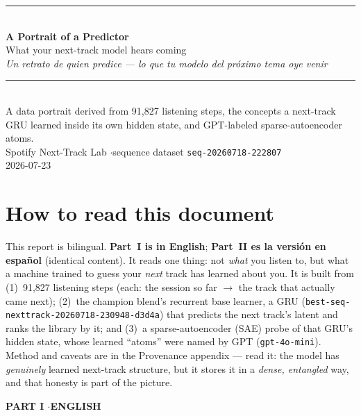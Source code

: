 \documentclass[11pt]{article}
\begin{document}
\begin{titlepage}
\centering
\vspace*{3cm}
{\color{accent}\rule{\textwidth}{2pt}}\\[0.8em]
{\Huge\bfseries A Portrait of a Predictor}\\[0.4em]
{\Large What your next-track model hears coming}\\[0.6em]
{\large\itshape Un retrato de quien predice --- lo que tu modelo del próximo tema oye venir}\\[0.8em]
{\color{accent}\rule{\textwidth}{2pt}}\\[2cm]
{\large A data portrait derived from 91{,}827 listening steps, the concepts a next-track\\
GRU learned inside its own hidden state, and GPT-labeled sparse-autoencoder atoms.}\\[1cm]
{\normalsize Spotify Next-Track Lab \quad$\cdot$\quad sequence dataset \texttt{seq-20260718-222807}}\\[0.3em]
{\normalsize 2026-07-23}
\vfill
\end{titlepage}

\section*{How to read this document}
This report is bilingual. \textbf{Part~I is in English}; \textbf{Part~II es la
versión en español} (identical content). It reads one thing: not \emph{what} you
listen to, but what a machine trained to guess your \emph{next} track has learned
about you. It is built from (1)~91{,}827 listening steps (each: the session so
far $\rightarrow$ the track that actually came next); (2)~the champion blend's
recurrent base learner, a GRU (\texttt{best-seq-nexttrack-20260718-230948-d3d4a})
that predicts the next track's latent and ranks the library by it; and (3)~a
sparse-autoencoder (SAE) probe of that GRU's hidden state, whose learned
``atoms'' were named by GPT (\texttt{gpt-4o-mini}). Method and caveats are in the
Provenance appendix --- read it: the model has \emph{genuinely} learned next-track
structure, but it stores it in a \emph{dense, entangled} way, and that honesty is
part of the picture.

\clearpage
\begin{center}{\color{blu}\Large\bfseries PART I \quad$\cdot$\quad ENGLISH}\end{center}
\vspace{0.5em}
\end{document}

